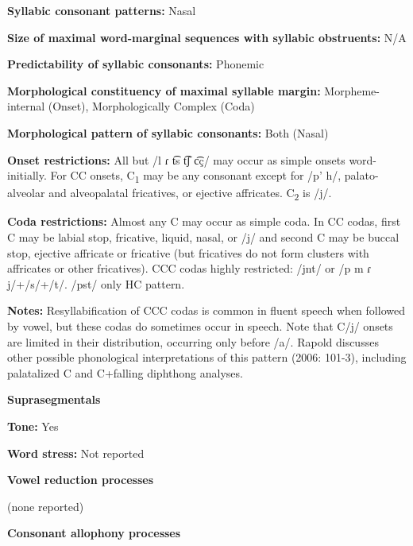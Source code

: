 \textbf{Syllabic consonant patterns:} Nasal



\textbf{Size of maximal word{}-marginal sequences with syllabic obstruents:} N/A



\textbf{Predictability of syllabic consonants:} Phonemic



\textbf{Morphological constituency of maximal syllable margin:} Morpheme-internal (Onset), Morphologically Complex (Coda)



\textbf{Morphological pattern of syllabic consonants:} Both (Nasal)



\textbf{Onset restrictions:} All but /l ɾ t͡s t͡ʃ c͡ç/ may occur as simple onsets word-initially. For CC onsets, C\textsubscript{1} may be any consonant except for /p’ h/, palato-alveolar and alveopalatal fricatives, or ejective affricates. C\textsubscript{2} is /j/.



\textbf{Coda restrictions:} Almost any C may occur as simple coda. In CC codas, first C may be labial stop, fricative, liquid, nasal, or /j/ and second C may be buccal stop, ejective affricate or fricative (but fricatives do not form clusters with affricates or other fricatives). CCC codas highly restricted: /jnt/ or /p m ɾ j/+/s/+/t/. /pst/ only HC pattern.



\textbf{Notes:} Resyllabification of CCC codas is common in fluent speech when followed by vowel, but these codas do sometimes occur in speech. Note that C/j/ onsets are limited in their distribution, occurring only before /a/. Rapold discusses other possible phonological interpretations of this pattern (2006: 101-3), including palatalized C and C+falling diphthong analyses.



\textbf{Suprasegmentals}



\textbf{Tone:} Yes



\textbf{Word stress:} Not reported



\textbf{Vowel reduction processes}



(none reported)



\textbf{Consonant allophony processes}



